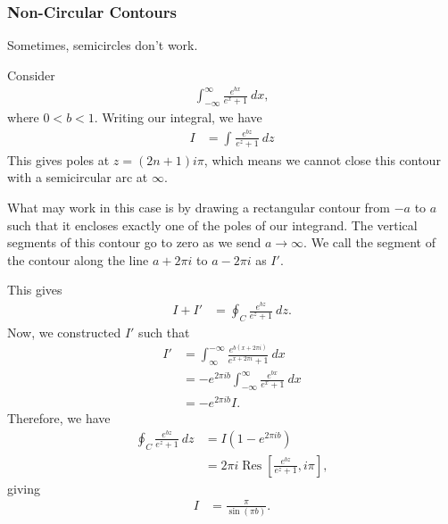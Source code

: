 \documentclass[10pt]{mypackage}
\DeclareMathOperator{\res}{Res}
\begin{document}
   \subsubsection{Non-Circular Contours}%
   Sometimes, semicircles don't work.
   \begin{example}
     Consider
     \begin{align*}
       \int_{-\infty}^{\infty} \frac{e^{bx}}{e^x + 1}\:dx,
     \end{align*}
     where $0 < b < 1$. Writing our integral, we have
     \begin{align*}
       I &= \int_{}^{} \frac{e^{bz}}{e^{z} + 1}\:dz
     \end{align*}
     This gives poles at $z = \left( 2n + 1 \right)i\pi$, which means we cannot close this contour with a semicircular arc at $\infty$.\newline

     What may work in this case is by drawing a rectangular contour from $-a$ to $a$ such that it encloses exactly one of the poles of our integrand. The vertical segments of this contour go to zero as we send $a\rightarrow\infty$. We call the segment of the contour along the line $a + 2\pi i$ to $a - 2\pi i$ as $I'$.\newline

     This gives
     \begin{align*}
       I + I' &= \oint_{C}\frac{e^{bz}}{e^{z} + 1}\:dz.
     \end{align*}
     Now, we constructed $I'$ such that
     \begin{align*}
       I' &= \int_{\infty}^{-\infty} \frac{e^{b\left( x + 2\pi i \right)}}{e^{x + 2\pi i} + 1} \:dx\\
          &= -e^{2\pi i b}\int_{-\infty}^{\infty} \frac{e^{bx}}{e^{x} + 1}\:dx\\
          &= -e^{2\pi i b} I.
     \end{align*}
     Therefore, we have
     \begin{align*}
       \oint_{C} \frac{e^{bz}}{e^{z} + 1}\:dz &= I\left( 1-e^{2\pi i b} \right)\\
                                              &= 2\pi i \res\left[ \frac{e^{bz}}{e^{z} + 1},i\pi \right],
     \end{align*}
     giving
     \begin{align*}
       I &= \frac{\pi}{\sin\left( \pi b \right)}.
     \end{align*}
   \end{example}
\end{document}
